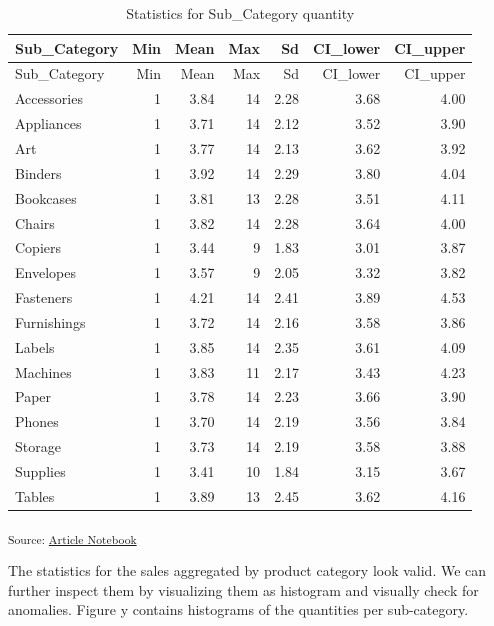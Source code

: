 \documentclass[
]{agujournal2019}
\begin{document}
\begin{longtable}[]{@{}lrrrrrr@{}}
\caption{Statistics for Sub\_Category quantity}\tabularnewline
\toprule\noalign{}
Sub\_Category & Min & Mean & Max & Sd & CI\_lower & CI\_upper \\
\midrule\noalign{}
\endfirsthead
\toprule\noalign{}
Sub\_Category & Min & Mean & Max & Sd & CI\_lower & CI\_upper \\
\midrule\noalign{}
\endhead
\bottomrule\noalign{}
\endlastfoot
Accessories & 1 & 3.84 & 14 & 2.28 & 3.68 & 4.00 \\
Appliances & 1 & 3.71 & 14 & 2.12 & 3.52 & 3.90 \\
Art & 1 & 3.77 & 14 & 2.13 & 3.62 & 3.92 \\
Binders & 1 & 3.92 & 14 & 2.29 & 3.80 & 4.04 \\
Bookcases & 1 & 3.81 & 13 & 2.28 & 3.51 & 4.11 \\
Chairs & 1 & 3.82 & 14 & 2.28 & 3.64 & 4.00 \\
Copiers & 1 & 3.44 & 9 & 1.83 & 3.01 & 3.87 \\
Envelopes & 1 & 3.57 & 9 & 2.05 & 3.32 & 3.82 \\
Fasteners & 1 & 4.21 & 14 & 2.41 & 3.89 & 4.53 \\
Furnishings & 1 & 3.72 & 14 & 2.16 & 3.58 & 3.86 \\
Labels & 1 & 3.85 & 14 & 2.35 & 3.61 & 4.09 \\
Machines & 1 & 3.83 & 11 & 2.17 & 3.43 & 4.23 \\
Paper & 1 & 3.78 & 14 & 2.23 & 3.66 & 3.90 \\
Phones & 1 & 3.70 & 14 & 2.19 & 3.56 & 3.84 \\
Storage & 1 & 3.73 & 14 & 2.19 & 3.58 & 3.88 \\
Supplies & 1 & 3.41 & 10 & 1.84 & 3.15 & 3.67 \\
Tables & 1 & 3.89 & 13 & 2.45 & 3.62 & 4.16 \\
\end{longtable}

\textsubscript{Source:
\href{https://SJbrou.github.io/Supply_Chain_Data_Analysis/index.qmd.html}{Article
Notebook}}

The statistics for the sales aggregated by product category look valid.
We can further inspect them by visualizing them as histogram and
visually check for anomalies. Figure y contains histograms of the
quantities per sub-category.
\end{document}
